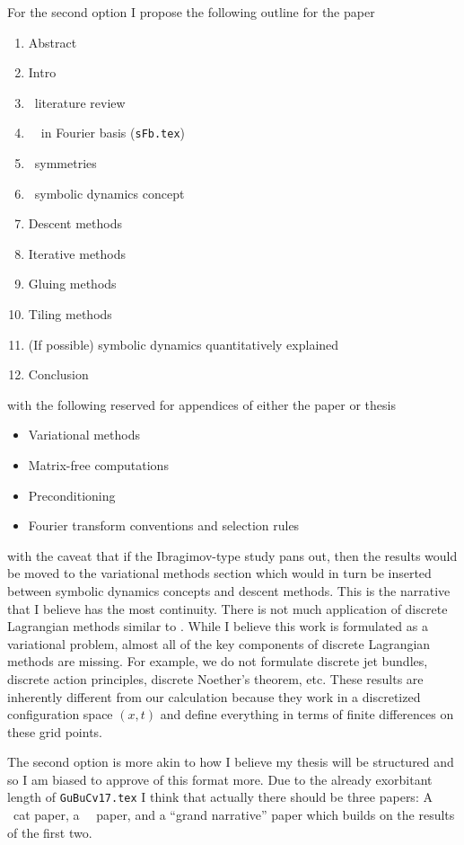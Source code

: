\begin{itemize}
For the second option I propose the following outline for the paper

\begin{enumerate}
\item Abstract
\item Intro
\item \KSe\ literature review
\item \Spt\ \KSe\ in Fourier basis (\texttt{sFb.tex})
\item \Spt\ symmetries
\item \Spt\ symbolic dynamics concept
\item Descent methods
\item Iterative methods
\item Gluing methods
\item Tiling methods
\item (If possible) symbolic dynamics quantitatively explained
\item Conclusion
\end{enumerate}
with the following reserved for appendices of either the paper or
thesis
\begin{itemize}
\item Variational methods
\item Matrix-free computations
\item Preconditioning
\item Fourier transform conventions and selection rules
\end{itemize}
with the caveat that if the Ibragimov-type study pans out, then
the results would be moved to the variational methods section which
would in turn be inserted between symbolic dynamics concepts and
descent methods. This is the narrative that I believe has the most
continuity. There is not much application of discrete Lagrangian methods
similar to . While I believe this work is formulated
as a variational problem, almost all of the key components of discrete Lagrangian
methods are missing. For example, we do not formulate discrete jet bundles, discrete
action principles, discrete Noether's theorem, etc. These results are inherently
different from our calculation because they work in a discretized configuration
space $(x,t)$ and define everything in terms of finite differences on these
grid points.

The second option is more akin to how I believe my thesis will be structured
and so I am biased to approve of this format more. Due to the already
exorbitant length of \texttt{GuBuCv17.tex} I think that actually there
should be three papers: A \spt\ cat paper, a \spt\ \KS\ paper, and a
``grand narrative'' paper which builds on the results of the first two.




\end{itemize}
